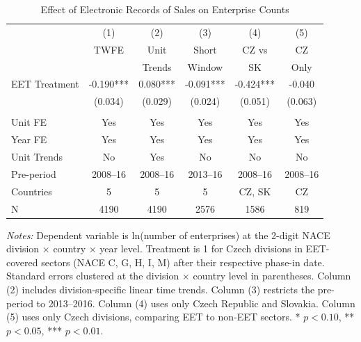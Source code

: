 \begin{table}[H]
\centering
\caption{Effect of Electronic Records of Sales on Enterprise Counts}
\begin{threeparttable}
\begin{tabular}{lccccc}
\toprule
 & (1) & (2) & (3) & (4) & (5) \\
 & TWFE & Unit & Short & CZ vs & CZ \\
 & & Trends & Window & SK & Only \\
\midrule
EET Treatment & -0.190*** & 0.080*** & -0.091*** & -0.424*** & -0.040 \\
 & (0.034) & (0.029) & (0.024) & (0.051) & (0.063) \\
 & & & & & \\
Unit FE & Yes & Yes & Yes & Yes & Yes \\
Year FE & Yes & Yes & Yes & Yes & Yes \\
Unit Trends & No & Yes & No & No & No \\
Pre-period & 2008--16 & 2008--16 & 2013--16 & 2008--16 & 2008--16 \\
Countries & 5 & 5 & 5 & CZ, SK & CZ \\
N & 4190 & 4190 & 2576 & 1586 & 819 \\
\bottomrule
\end{tabular}
\begin{tablenotes}[flushleft]
\small
\item \textit{Notes:} Dependent variable is ln(number of enterprises) at the 2-digit NACE division $\times$ country $\times$ year level. Treatment is 1 for Czech divisions in EET-covered sectors (NACE C, G, H, I, M) after their respective phase-in date. Standard errors clustered at the division $\times$ country level in parentheses. Column (2) includes division-specific linear time trends. Column (3) restricts the pre-period to 2013--2016. Column (4) uses only Czech Republic and Slovakia. Column (5) uses only Czech divisions, comparing EET to non-EET sectors. * $p<0.10$, ** $p<0.05$, *** $p<0.01$.
\end{tablenotes}
\end{threeparttable}
\label{tab:main}
\end{table}


